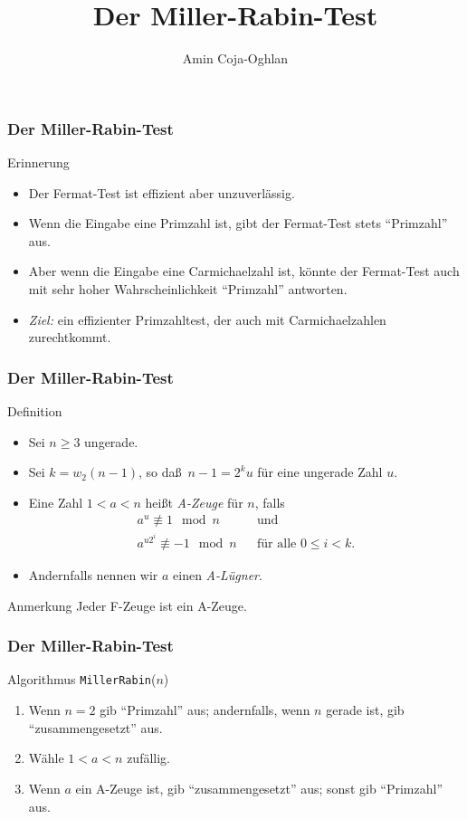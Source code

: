 \documentclass{beamer}
\title[Linadi]{Der Miller-Rabin-Test}
\author[Amin Coja-Oghlan]{Amin Coja-Oghlan}
\institute[Frankfurt]{JWGUFFM}
\date{}
\renewcommand{\emph}[1]{{\textcolor{solarizedRed}{\itshape #1}}}
\renewcommand{\ae}{\"a}
\renewcommand{\oe}{\"o}
\newcommand{\ue}{\"u}
\begin{document}
\frame[plain]{\titlepage}

\begin{frame}\frametitle{Der Miller-Rabin-Test}
	\begin{block}{Erinnerung}
		\begin{itemize}
			\item Der Fermat-Test ist effizient aber unzuverl\ae ssig.
			\item Wenn die Eingabe eine Primzahl ist, gibt der Fermat-Test stets ``Primzahl'' aus.
			\item Aber wenn die Eingabe eine Carmichaelzahl ist, k\oe nnte der Fermat-Test auch mit sehr hoher Wahrscheinlichkeit ``Primzahl'' antworten.
			\item \emph{Ziel:} ein effizienter Primzahltest, der auch mit Carmichaelzahlen zurechtkommt.
		\end{itemize}
	\end{block}
\end{frame}

\begin{frame}\frametitle{Der Miller-Rabin-Test}
	\begin{block}{Definition}
		\begin{itemize}
			\item Sei $n\geq3$ ungerade.
			\item Sei $k=w_2(n-1)$, so da\ss\ $n-1=2^ku$ f\ue r eine ungerade Zahl $u$.
			\item Eine Zahl $1<a<n$ hei\ss t \emph{A-Zeuge} f\ue r $n$, falls
				\begin{align*}
					a^{u}\not\equiv1\mod n&&\mbox{und}\\
					a^{u2^i}\not\equiv-1\mod n&&\mbox{f\ue r alle $0\leq i<k$.}
				\end{align*}
			\item Andernfalls nennen wir $a$ einen \emph{A-L\ue gner}.
		\end{itemize}
	\end{block}
	\begin{block}{Anmerkung}
Jeder F-Zeuge ist ein A-Zeuge.	
	\end{block}
\end{frame}



\begin{frame}\frametitle{Der Miller-Rabin-Test}
	\begin{block}{Algorithmus {\tt MillerRabin}($n$)}
		\begin{enumerate}
			\item Wenn $n=2$ gib ``Primzahl'' aus; andernfalls, wenn $n$ gerade ist, gib ``zusammengesetzt'' aus.
			\item W\ae hle $1<a<n$ zuf\ae llig.
			\item Wenn $a$ ein A-Zeuge ist, gib ``zusammengesetzt'' aus; sonst gib ``Primzahl'' aus.
		\end{enumerate}
	\end{block}
\end{frame}
\end{document}
